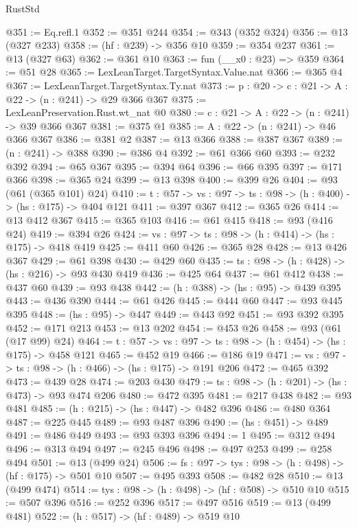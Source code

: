 \begin{lexlean}{RustStd}
\begin{coremodule}
@351 := Eq.refl.{1}
@352 := @351 @244
@354 := @343 (@352 @324)
@356 := @13 (@327 @233)
@358 := (hf : @239) -> @356 @10
@359 := @354 @237
@361 := @13 (@327 @63)
@362 := @361 @10
@363 := fun (__x0 : @23) => @359
@364 := @51 @28
@365 := LexLeanTarget.TargetSyntax.Value.nat
@366 := @365 @4
@367 := LexLeanTarget.TargetSyntax.Ty.nat
@373 := {p : @20} -> {c : @21} -> {A : @22} -> (n : @241) -> @29 @366 @367
@375 := LexLeanPreservation.Rust.wt_nat @0
@380 := {c : @21} -> {A : @22} -> (n : @241) -> @39 @366 @367
@381 := @375 @1
@385 := {A : @22} -> (n : @241) -> @46 @366 @367
@386 := @381 @2
@387 := @13 @366
@388 := @387 @367
@389 := (n : @241) -> @388
@390 := @386 @4
@392 := @61 @366 @60
@393 := @232 @392
@394 := @65 @367
@395 := @394 @64
@396 := @66 @395
@397 := @171 @366
@398 := @365 @24
@399 := @13 @398
@400 := @399 @26
@404 := @93 (@61 (@365 @101) @24)
@410 := {t : @57} -> {vs : @97} -> {ts : @98} -> (h : @400) -> (hs : @175) -> @404 @121
@411 := @397 @367
@412 := @365 @26
@414 := @13 @412 @367
@415 := @365 @103
@416 := @61 @415
@418 := @93 (@416 @24)
@419 := @394 @26
@424 := {vs : @97} -> {ts : @98} -> (h : @414) -> (hs : @175) -> @418 @419
@425 := @411 @60
@426 := @365 @28
@428 := @13 @426 @367
@429 := @61 @398
@430 := @429 @60
@435 := {ts : @98} -> (h : @428) -> (hs : @216) -> @93 @430 @419
@436 := @425 @64
@437 := @61 @412
@438 := @437 @60
@439 := @93 @438
@442 := (h : @388) -> (hs : @95) -> @439 @395
@443 := @436 @390
@444 := @61 @426
@445 := @444 @60
@447 := @93 @445 @395
@448 := (hs : @95) -> @447
@449 := @443 @92
@451 := @93 @392 @395
@452 := @171 @213
@453 := @13 @202
@454 := @453 @26
@458 := @93 (@61 (@17 @99) @24)
@464 := {t : @57} -> {vs : @97} -> {ts : @98} -> (h : @454) -> (hs : @175) -> @458 @121
@465 := @452 @19
@466 := @186 @19
@471 := {vs : @97} -> {ts : @98} -> (h : @466) -> (hs : @175) -> @191 @206
@472 := @465 @392
@473 := @439 @28
@474 := @203 @430
@479 := {ts : @98} -> (h : @201) -> (hs : @473) -> @93 @474 @206
@480 := @472 @395
@481 := @217 @438
@482 := @93 @481
@485 := (h : @215) -> (hs : @447) -> @482 @396
@486 := @480 @364
@487 := @225 @445
@489 := @93 @487 @396
@490 := (hs : @451) -> @489
@491 := @486 @449
@493 := @93 @393 @396
@494 := 1
@495 := @312 @494
@496 := @313 @494
@497 := @245 @496
@498 := @497 @253
@499 := @258 @494
@501 := @13 (@499 @24)
@506 := {fs : @97} -> {tys : @98} -> (h : @498) -> (hf : @175) -> @501 @10
@507 := @495 @393
@508 := @482 @28
@510 := @13 (@499 @474)
@514 := {tys : @98} -> (h : @498) -> (hf : @508) -> @510 @10
@515 := @507 @396
@516 := @252 @396
@517 := @497 @516
@519 := @13 (@499 @481)
@522 := (h : @517) -> (hf : @489) -> @519 @10

\end{coremodule}
\end{lexlean}

